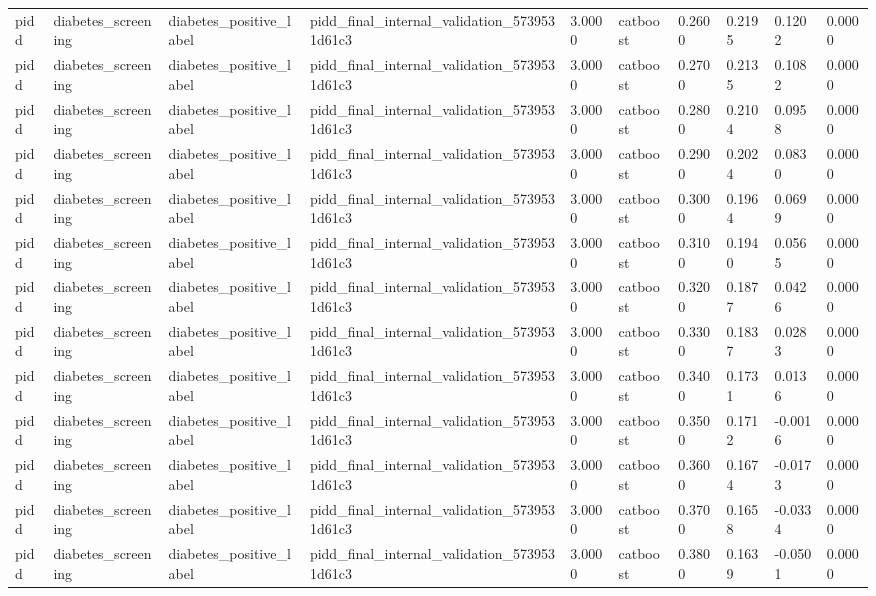 \begin{tabular}{llllllllll}
pidd & diabetes\_screening & diabetes\_positive\_label & pidd\_final\_internal\_validation\_5739531d61c3 & 3.0000 & catboost & 0.2600 & 0.2195 & 0.1202 & 0.0000 \\
pidd & diabetes\_screening & diabetes\_positive\_label & pidd\_final\_internal\_validation\_5739531d61c3 & 3.0000 & catboost & 0.2700 & 0.2135 & 0.1082 & 0.0000 \\
pidd & diabetes\_screening & diabetes\_positive\_label & pidd\_final\_internal\_validation\_5739531d61c3 & 3.0000 & catboost & 0.2800 & 0.2104 & 0.0958 & 0.0000 \\
pidd & diabetes\_screening & diabetes\_positive\_label & pidd\_final\_internal\_validation\_5739531d61c3 & 3.0000 & catboost & 0.2900 & 0.2024 & 0.0830 & 0.0000 \\
pidd & diabetes\_screening & diabetes\_positive\_label & pidd\_final\_internal\_validation\_5739531d61c3 & 3.0000 & catboost & 0.3000 & 0.1964 & 0.0699 & 0.0000 \\
pidd & diabetes\_screening & diabetes\_positive\_label & pidd\_final\_internal\_validation\_5739531d61c3 & 3.0000 & catboost & 0.3100 & 0.1940 & 0.0565 & 0.0000 \\
pidd & diabetes\_screening & diabetes\_positive\_label & pidd\_final\_internal\_validation\_5739531d61c3 & 3.0000 & catboost & 0.3200 & 0.1877 & 0.0426 & 0.0000 \\
pidd & diabetes\_screening & diabetes\_positive\_label & pidd\_final\_internal\_validation\_5739531d61c3 & 3.0000 & catboost & 0.3300 & 0.1837 & 0.0283 & 0.0000 \\
pidd & diabetes\_screening & diabetes\_positive\_label & pidd\_final\_internal\_validation\_5739531d61c3 & 3.0000 & catboost & 0.3400 & 0.1731 & 0.0136 & 0.0000 \\
pidd & diabetes\_screening & diabetes\_positive\_label & pidd\_final\_internal\_validation\_5739531d61c3 & 3.0000 & catboost & 0.3500 & 0.1712 & -0.0016 & 0.0000 \\
pidd & diabetes\_screening & diabetes\_positive\_label & pidd\_final\_internal\_validation\_5739531d61c3 & 3.0000 & catboost & 0.3600 & 0.1674 & -0.0173 & 0.0000 \\
pidd & diabetes\_screening & diabetes\_positive\_label & pidd\_final\_internal\_validation\_5739531d61c3 & 3.0000 & catboost & 0.3700 & 0.1658 & -0.0334 & 0.0000 \\
pidd & diabetes\_screening & diabetes\_positive\_label & pidd\_final\_internal\_validation\_5739531d61c3 & 3.0000 & catboost & 0.3800 & 0.1639 & -0.0501 & 0.0000 \\

\end{tabular}
